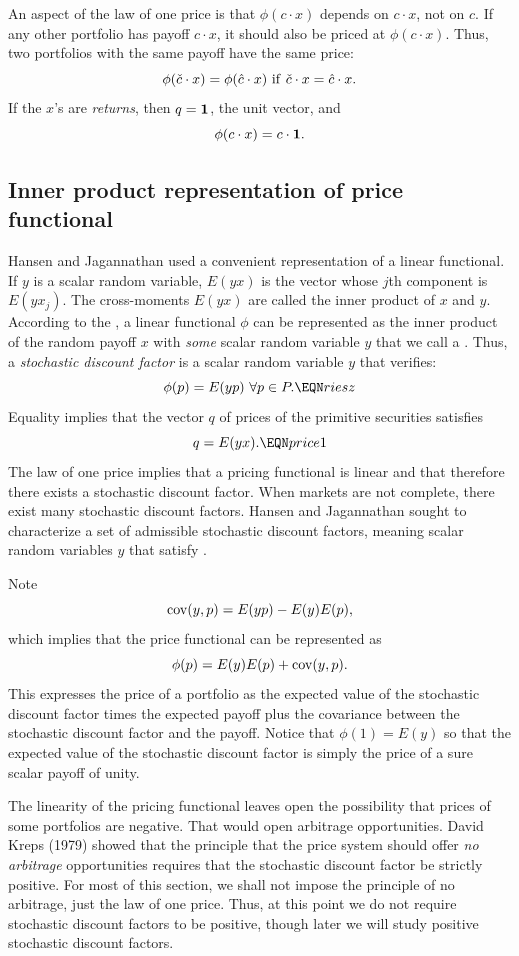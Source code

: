 An aspect of the law of one price is that $\phi(c \cdot x)$ depends
on $c\cdot x$, not on $c$.  If any other portfolio has payoff $c \cdot x$,
it should also be priced at $\phi(c\cdot x)$.  Thus, two portfolios with
the same payoff have the same price:
$$ \phi(\check c \cdot x) = \phi(\hat c \cdot x)  \ {\rm if } \ \check c\cdot x = \hat c\cdot x.$$
If the $x$'s are {\it returns}, then $q={\bf 1}$, the unit
vector,  and
$$ \phi(c \cdot x) = c \cdot {\bf 1}. $$

\subsection{Inner product representation of  price functional}
Hansen and Jagannathan used a convenient representation of a linear functional.
   If $y$ is a scalar random variable, $E (yx)$ is the vector whose $j$th
component is $E(yx_j)$.  The cross-moments $E(yx)$ are called the inner
product of $x$ and $y$.  According to the ,
a linear functional $\phi$ can be represented as the inner product of the random
payoff $x$ with {\it some\/} scalar random variable $y$ that we call
a .   Thus, a {\it stochastic
discount factor\/} is a scalar random variable $y$ that verifies:
$$ \phi(p) = E(y p) \  \forall p \in P. \EQN riesz $$
Equality  implies that  the vector  $q$ of prices of the primitive securities satisfies
$$ q  = E (y x).  \EQN price1 $$
The law of one price
implies that   a pricing functional is linear and that therefore  there exists a stochastic discount factor.
When markets are not complete, there exist
many stochastic discount factors.  Hansen and Jagannathan sought to characterize
a set of admissible stochastic  discount factors, meaning scalar random variables $y$ that satisfy
.

Note
$$ {\rm cov}(y,p) = E(y p) - E(y) E(p), $$
which implies that the price functional can be represented as
$$  \phi(p) = E(y) E(p) + {\rm cov}(y,p) .$$
This expresses the price of a portfolio as the expected value of the stochastic discount factor
times the expected payoff   plus
the covariance between the stochastic discount factor and the payoff.
Notice that $\phi(1) = E (y) $ so that  the expected value of the stochastic discount factor is simply the
price of a sure scalar payoff of unity.


  The linearity of the pricing functional leaves open the possibility
that prices of some portfolios are negative.  That would open
 arbitrage opportunities. David Kreps (1979) showed that
%
 the principle that the price system should offer
{\it no arbitrage\/} opportunities 
requires that the stochastic discount factor be
strictly positive.  For most of this section, we shall not impose
the principle of no arbitrage, just the law of one price.  Thus, at this point
we do not require stochastic discount factors to be positive, though later we will study
positive stochastic discount factors.

